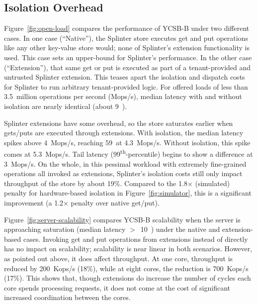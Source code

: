 \subsection{Isolation Overhead}
\label{sec:isolation-overhead}


Figure~\ref{fig:open-load} compares the performance of YCSB-B under two
different cases.
In one case (``Native''), the Splinter store executes get and put operations like
  any other key-value store would; none of Splinter's extension functionality
  is used.
This case sets an upper-bound for Splinter's performance.
In the other case (``Extension''), that same get or put is executed as part of a
  tenant-provided and untrusted Splinter extension.
This teases apart the isolation and dispatch costs for Splinter to run
  arbitrary tenant-provided logic.
For offered loads of less than 3.5~million operations per second (Mops/s), median
  latency with and without isolation are nearly identical (about 9~\us).

Splinter extensions have some overhead, so the store saturates
  earlier when gets/puts are executed through extensions.
With isolation, the median latency spikes above 4~Mops/s, reaching 59~\us at
  4.3~Mops/s.
Without isolation, this spike comes at 5.3~Mops/s.
Tail latency (99\textsuperscript{th}-percentile) begins to show a difference at
  3~Mops/s.
On the whole, in this pessimal workload with extremely fine-grained operations
  all invoked as extensions, Splinter's isolation costs still only impact
  throughput of the store by about 19\%.
Compared to the 1.8$\times$ (simulated) penalty for hardware-based
  isolation in Figure~\ref{fig:simulator}, this is a significant
  improvement (a 1.2$\times$ penalty over native get/put).

Figure~\ref{fig:server-scalability} compares YCSB-B scalability when the server
  is approaching saturation (median latency $>$~10~\us) under the native and
  extension-based cases.
Invoking get and put operations from extensions instead of directly has no
  impact on scalability; scalability is near linear in both scenarios.
However, as pointed out above, it does affect throughput.
At one core, throughput is reduced by 200~Kops/s (18\%), while at eight cores,
  the reduction is 700~Kops/s (17\%).
This shows that, though extensions do increase the number of cycles each core
  spends processing requests, it does not come at the cost of significant
  increased coordination between the cores.

